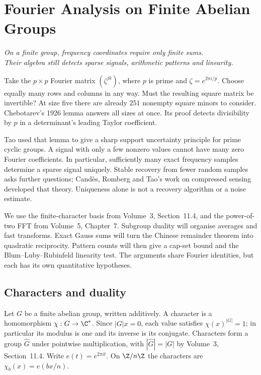 \chapter{Fourier Analysis on Finite Abelian Groups}\label{ch:finite}

\begin{center}\itshape
On a finite group, frequency coordinates require only finite sums.\\
Their algebra still detects sparse signals, arithmetic patterns and linearity.
\end{center}

Take the $p\times p$ Fourier matrix $(\zeta^{jk})$, where $p$ is prime and $\zeta=e^{2\pi i/p}$. Choose equally many rows and columns in any way. Must the resulting square matrix be invertible? At size five there are already $251$ nonempty square minors to consider. Chebotarev's 1926 lemma answers all sizes at once. Its proof detects divisibility by $p$ in a determinant's leading Taylor coefficient.

Tao used that lemma to give a sharp support uncertainty principle for prime cyclic groups. A signal with only a few nonzero values cannot have many zero Fourier coefficients. In particular, sufficiently many exact frequency samples determine a sparse signal uniquely. Stable recovery from fewer random samples asks further questions; Cand\`es, Romberg and Tao's work on compressed sensing developed that theory. Uniqueness alone is not a recovery algorithm or a noise estimate.

We use the finite-character basis from Volume~3, Section~11.4, and the power-of-two FFT from Volume~5, Chapter~7. Subgroup duality will organise averages and fast transforms. Exact Gauss sums will turn the Chinese remainder theorem into quadratic reciprocity. Pattern counts will then give a cap-set bound and the Blum--Luby--Rubinfeld linearity test. The arguments share Fourier identities, but each has its own quantitative hypotheses.

\section{Characters and duality}

Let $G$ be a finite abelian group, written additively. A character is a homomorphism $\chi:G\to\C^*$. Since $|G|x=0$, each value satisfies $\chi(x)^{|G|}=1$; in particular its modulus is one and its inverse is its conjugate. Characters form a group $\widehat G$ under pointwise multiplication, with $|\widehat G|=|G|$ by Volume~3, Section~11.4. Write $e(t)=e^{2\pi it}$. On $\Z/n\Z$ the characters are $\chi_b(x)=e(bx/n)$.

